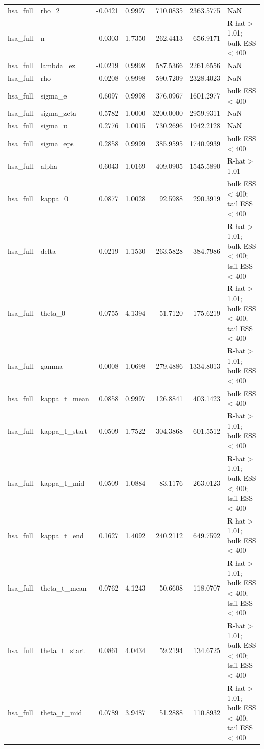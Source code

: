\begin{tabular}{llrrrrl}
hsa\_full & rho\_2 & -0.0421 & 0.9997 & 710.0835 & 2363.5775 & NaN \\
hsa\_full & n & -0.0303 & 1.7350 & 262.4413 & 656.9171 & R-hat > 1.01; bulk ESS < 400 \\
hsa\_full & lambda\_ez & -0.0219 & 0.9998 & 587.5366 & 2261.6556 & NaN \\
hsa\_full & rho & -0.0208 & 0.9998 & 590.7209 & 2328.4023 & NaN \\
hsa\_full & sigma\_e & 0.6097 & 0.9998 & 376.0967 & 1601.2977 & bulk ESS < 400 \\
hsa\_full & sigma\_zeta & 0.5782 & 1.0000 & 3200.0000 & 2959.9311 & NaN \\
hsa\_full & sigma\_u & 0.2776 & 1.0015 & 730.2696 & 1942.2128 & NaN \\
hsa\_full & sigma\_eps & 0.2858 & 0.9999 & 385.9595 & 1740.9939 & bulk ESS < 400 \\
hsa\_full & alpha & 0.6043 & 1.0169 & 409.0905 & 1545.5890 & R-hat > 1.01 \\
hsa\_full & kappa\_0 & 0.0877 & 1.0028 & 92.5988 & 290.3919 & bulk ESS < 400; tail ESS < 400 \\
hsa\_full & delta & -0.0219 & 1.1530 & 263.5828 & 384.7986 & R-hat > 1.01; bulk ESS < 400; tail ESS < 400 \\
hsa\_full & theta\_0 & 0.0755 & 4.1394 & 51.7120 & 175.6219 & R-hat > 1.01; bulk ESS < 400; tail ESS < 400 \\
hsa\_full & gamma & 0.0008 & 1.0698 & 279.4886 & 1334.8013 & R-hat > 1.01; bulk ESS < 400 \\
hsa\_full & kappa\_t\_mean & 0.0858 & 0.9997 & 126.8841 & 403.1423 & bulk ESS < 400 \\
hsa\_full & kappa\_t\_start & 0.0509 & 1.7522 & 304.3868 & 601.5512 & R-hat > 1.01; bulk ESS < 400 \\
hsa\_full & kappa\_t\_mid & 0.0509 & 1.0884 & 83.1176 & 263.0123 & R-hat > 1.01; bulk ESS < 400; tail ESS < 400 \\
hsa\_full & kappa\_t\_end & 0.1627 & 1.4092 & 240.2112 & 649.7592 & R-hat > 1.01; bulk ESS < 400 \\
hsa\_full & theta\_t\_mean & 0.0762 & 4.1243 & 50.6608 & 118.0707 & R-hat > 1.01; bulk ESS < 400; tail ESS < 400 \\
hsa\_full & theta\_t\_start & 0.0861 & 4.0434 & 59.2194 & 134.6725 & R-hat > 1.01; bulk ESS < 400; tail ESS < 400 \\
hsa\_full & theta\_t\_mid & 0.0789 & 3.9487 & 51.2888 & 110.8932 & R-hat > 1.01; bulk ESS < 400; tail ESS < 400 \\

\end{tabular}
